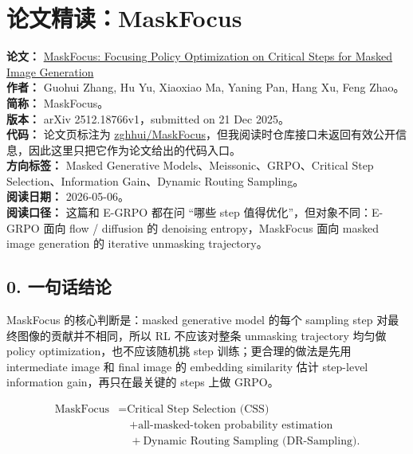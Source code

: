 
\section{论文精读：MaskFocus}

\begin{conceptbox}
\textbf{论文：} \href{https://arxiv.org/abs/2512.18766}{MaskFocus: Focusing Policy Optimization on Critical Steps for Masked Image Generation}\\
\textbf{作者：} Guohui Zhang, Hu Yu, Xiaoxiao Ma, Yaning Pan, Hang Xu, Feng Zhao。\\
\textbf{简称：} MaskFocus。\\
\textbf{版本：} arXiv 2512.18766v1，submitted on 21 Dec 2025。\\
\textbf{代码：} 论文页标注为 \href{https://github.com/zghhui/MaskFocus}{zghhui/MaskFocus}，但我阅读时仓库接口未返回有效公开信息，因此这里只把它作为论文给出的代码入口。\\
\textbf{方向标签：} Masked Generative Models、Meissonic、GRPO、Critical Step Selection、Information Gain、Dynamic Routing Sampling。\\
\textbf{阅读日期：} 2026-05-06。\\
\textbf{阅读口径：} 这篇和 E-GRPO 都在问 ``哪些 step 值得优化''，但对象不同：E-GRPO 面向 flow / diffusion 的 denoising entropy，MaskFocus 面向 masked image generation 的 iterative unmasking trajectory。
\end{conceptbox}

\subsection{0. 一句话结论}

MaskFocus 的核心判断是：masked generative model 的每个 sampling step 对最终图像的贡献并不相同，所以 RL 不应该对整条 unmasking trajectory 均匀做 policy optimization，也不应该随机挑 step 训练；更合理的做法是先用 intermediate image 和 final image 的 embedding similarity 估计 step-level information gain，再只在最关键的 steps 上做 GRPO。

\[
\begin{aligned}
\text{MaskFocus}
&= \text{Critical Step Selection (CSS)}\\
&\quad + \text{all-masked-token probability estimation}\\
&\quad + \text{Dynamic Routing Sampling (DR-Sampling)}.
\end{aligned}
\]

